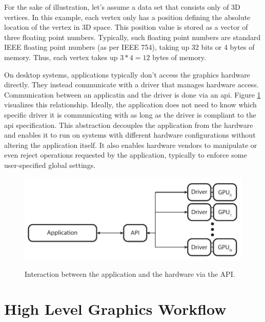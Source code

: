   For the sake of illustration, let's assume a data set that consists only of 3D vertices. In this example, each vertex only has a position defining the absolute location of the vertex in 3D space. This position value is stored as a vector of three floating point numbers. Typically, such floating point numbers are standard IEEE floating point numbers (as per IEEE 754), taking up 32 bits or 4 bytes of memory. Thus, each vertex takes up $3*4 = 12$ bytes of memory.

  On desktop systems, applications typically don't access the graphics hardware directly. They instead communicate with a driver that manages hardware access. Communication between an applicatin and the driver is done via an \acrfull{api}. Figure \ref{fig:AppApiDriverOverview} visualizes this relationship. Ideally, the application does not need to know which specific driver it is communicating with as long as the driver is compliant to the \acrshort{api} specification. This abstraction decouples the application from the hardware and enables it to run on systems with different hardware configurations without altering the application itself. It also enables hardware vendors to manipulate or even reject operations requested by the application, typically to enforce some user-specified global settings. 

  \begin{figure}
    \caption{Interaction between the application and the hardware via the API.}
    \centering
    \includegraphics{Main/Images/Application_API_Driver_Overview}
    \label{fig:AppApiDriverOverview}
  \end{figure}



  \section{High Level Graphics Workflow}


